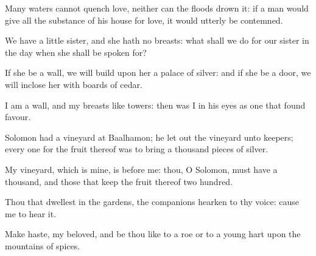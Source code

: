 \documentclass[0main.tex]{subfiles}
\begin{document}
Many waters cannot quench love, neither can the floods drown it: if a man would give all the substance of his house for love, it would utterly be contemned.

We have a little sister, and she hath no breasts: what shall we do for our sister in the day when she shall be spoken for?

If she be a wall, we will build upon her a palace of silver: and if she be a door, we will inclose her with boards of cedar.

I am a wall, and my breasts like towers: then was I in his eyes as one that found favour.

Solomon had a vineyard at Baalhamon; he let out the vineyard unto keepers; every one for the fruit thereof was to bring a thousand pieces of silver.

My vineyard, which is mine, is before me: thou, O Solomon, must have a thousand, and those that keep the fruit thereof two hundred.

Thou that dwellest in the gardens, the companions hearken to thy voice: cause me to hear it.

Make haste, my beloved, and be thou like to a roe or to a young hart upon the mountains of spices.


\end{document}
